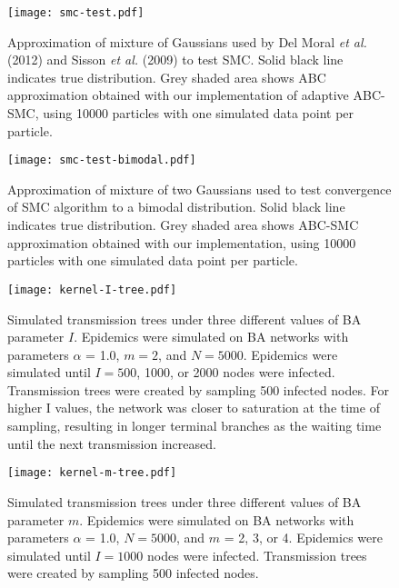 \begin{figure}[ht]
  \centering
  \texttt{[image: smc-test.pdf]}
  \caption[
      Approximation of mixture of Gaussians used by Del Moral \textit{et al.}
      (2012) and Sisson \textit{et al.} (2009) to test adaptive
      \gls{ABC}-\gls{SMC}.
    ]{
      Approximation of mixture of Gaussians used by Del Moral \textit{et al.}
      (2012) and Sisson \textit{et al.} (2009) to test SMC. Solid black line
      indicates true distribution. Grey shaded area shows \gls{ABC}
      approximation obtained with our implementation of adaptive
      \gls{ABC}-\gls{SMC}, using 10000 particles with one simulated data point
      per particle.
    }
  \label{fig:smctest}
\end{figure}

\begin{figure}[ht]
  \centering
  \texttt{[image: smc-test-bimodal.pdf]}
  \caption[
    Approximation of mixture of two Gaussians used to test convergence of
    adaptive \gls{ABC}-\gls{SMC} algorithm to a bimodal distribution.
  ]{
    Approximation of mixture of two Gaussians used to test convergence of SMC
    algorithm to a bimodal distribution. Solid black line indicates true
    distribution. Grey shaded area shows \gls{ABC}-\gls{SMC} approximation
    obtained with our implementation, using 10000 particles with one simulated
    data point per particle.
  }
  \label{fig:smctest2}
\end{figure}

\begin{figure}[ht]
  \centering
  \texttt{[image: kernel-I-tree.pdf]}
  \caption[Simulated transmission trees under three different values of BA parameter $I$]{
    Simulated transmission trees under three different values of BA parameter
    $I$. Epidemics were simulated on \gls{BA} networks with parameters $\alpha$
    = 1.0, $m = 2$, and $N = 5000$. Epidemics were simulated until $I = 500$,
    1000, or 2000 nodes were infected. Transmission trees were created by
    sampling 500 infected nodes. For higher \gls{I} values, the network was
    closer to saturation at the time of sampling, resulting in longer terminal
    branches as the waiting time until the next transmission increased.
  }
  \label{fig:Itrees}
\end{figure}

\begin{figure}[ht]
  \centering
  \texttt{[image: kernel-m-tree.pdf]}
  \caption[Simulated transmission trees under three different values of BA parameter $m$]{
    Simulated transmission trees under three different values of BA parameter
    $m$. Epidemics were simulated on \gls{BA} networks with parameters $\alpha$
    = 1.0, $N = 5000$, and $m$ = 2, 3, or 4. Epidemics were simulated until $I
    = 1000$ nodes were infected. Transmission trees were created by sampling
    500 infected nodes.
  }
  \label{fig:mtrees}
\end{figure}

